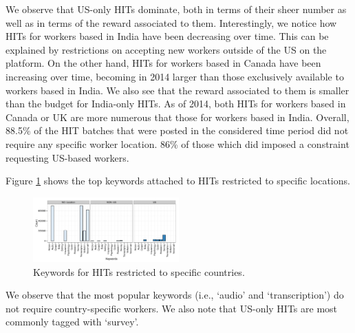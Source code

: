 We observe that US-only HITs dominate, both in terms of their sheer number as well as in terms of the reward associated to them. 
Interestingly, we notice how HITs for workers based in India have been decreasing over time. This can be explained by \amt{} restrictions on accepting new workers outside of the US on the platform.
On the other hand, HITs for workers based in Canada have been increasing over time, becoming in 2014 larger than those exclusively available to workers based in India.  We also see that the reward associated to them is smaller than the budget for India-only HITs.
As of 2014, both HITs for workers based in Canada or UK are more numerous that those for workers based in India.
Overall, 88.5\% of the HIT batches that were posted in the considered time period did not require any specific worker location. 86\% of those which did imposed a constraint requesting US-based workers.


Figure \ref{fig:keyword_loc} shows the top keywords attached to HITs restricted to specific locations.
\begin{figure}[tb]
	\centering
		\includegraphics[width=0.5\textwidth]{figures/keywords_location}
	\caption{Keywords for HITs restricted to specific countries.}
	\label{fig:keyword_loc}
\end{figure}
We observe that the most popular keywords (i.e., `audio' and `transcription') do not require country-specific workers. 
We also note that US-only HITs are most commonly tagged with `survey'.


